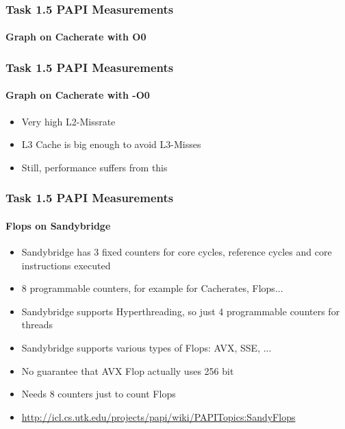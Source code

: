 \begin{frame}
\frametitle{Task 1.5 PAPI Measurements}
\framesubtitle{Graph on Cacherate with O0}
\end{frame}

\begin{frame}
\frametitle{Task 1.5 PAPI Measurements}
\framesubtitle{Graph on Cacherate with -O0}
\begin{itemize}
\item Very high L2-Missrate
\item L3 Cache is big enough to avoid L3-Misses
\item Still, performance suffers from this
\end{itemize}
\end{frame}


\begin{frame}
\frametitle{Task 1.5 PAPI Measurements}
\framesubtitle{Flops on Sandybridge}
\begin{itemize}
\item Sandybridge has 3 fixed counters for core cycles, reference cycles and core instructions executed
\item 8 programmable counters, for example for Cacherates, Flops...
\item Sandybridge supports Hyperthreading, so just 4 programmable counters for threads
\item Sandybridge supports various types of Flops: AVX, SSE, ...
\item No guarantee that AVX Flop actually uses 256 bit
\item Needs 8 counters just to count Flops
\item \url{http://icl.cs.utk.edu/projects/papi/wiki/PAPITopics:SandyFlops}
\end{itemize}
\end{frame}